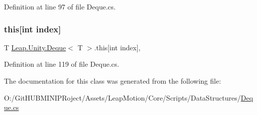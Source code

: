 Definition at line 97 of file Deque.\+cs.

\mbox{\label{class_leap_1_1_unity_1_1_deque_ac6ec12e1519aa5105be2972d19472f3a}} 
\subsubsection{\texorpdfstring{this[int index]}{this[int index]}}
{\footnotesize\ttfamily T \mbox{\hyperlink{class_leap_1_1_unity_1_1_deque}{Leap.\+Unity.\+Deque}}$<$ T $>$.this\mbox{[}int index\mbox{]}\hspace{0.3cm}{\ttfamily [get]}, {\ttfamily [set]}}



Definition at line 119 of file Deque.\+cs.



The documentation for this class was generated from the following file\+:\begin{DoxyCompactItemize}
\item 
O\+:/\+Git\+H\+U\+B\+M\+I\+N\+I\+P\+Roject/\+Assets/\+Leap\+Motion/\+Core/\+Scripts/\+Data\+Structures/\mbox{\hyperlink{_deque_8cs}{Deque.\+cs}}\end{DoxyCompactItemize}
